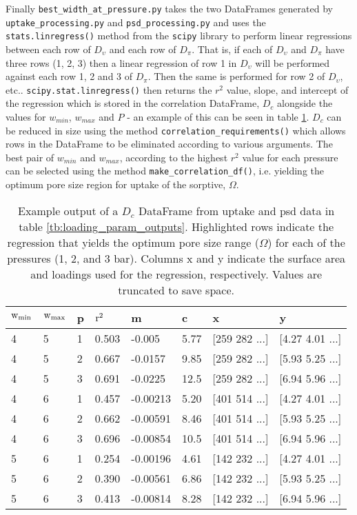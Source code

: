 Finally \verb|best_width_at_pressure.py| takes the two DataFrames generated by \verb|uptake_processing.py| and \verb|psd_processing.py| and uses the \verb|stats.linregress()| method from the \verb|scipy| library\citep{SciPy2020} to perform linear regressions between each row of $D_\upsilon$ and each row of $D_\pi$. That is, if each of $D_\upsilon$ and $D_\pi$ have three rows (1, 2, 3) then a linear regression of row 1 in $D_\upsilon$ will be performed against each row 1, 2 and 3 of $D_\pi$. Then the same is performed for row 2 of $D_\upsilon$, etc.. \verb|scipy.stat.linregress()| then returns the $r^2$ value, slope, and intercept of the regression which is stored in the correlation DataFrame, $D_c$ alongside the values for $w_{min}$, $w_{max}$ and $P$ - an example of this can be seen in table \ref{tb:D_c}. $D_c$ can be reduced in size using the method \verb|correlation_requirements()| which allows rows in the DataFrame to be eliminated according to various arguments. The best pair of $w_{min}$ and $w_{max}$, according to the highest $r^2$ value for each pressure can be selected using the method \verb|make_correlation_df()|, i.e. yielding the optimum pore size region for uptake of the sorptive, $\Omega$.

\begin{table}[h!]
    \centering
    \begin{tabular}{l|l|l|l|l|l|l|l}
        $\rm w_{min}$ & $\rm w_{max}$ & p & $\rm r^2$ & m & c & x & y \\
        \midrule
        \rowcolor{yellow} 4 & 5 & 1 & 0.503 & -0.005 & 5.77 & [259 282 ...] & [4.27 4.01 ...] \\
        \rowcolor{yellow} 4 & 5 & 2 & 0.667 & -0.0157	& 9.85 & [259 282 ...] & [5.93 5.25 ...] \\
        4 & 5 & 3 & 0.691 & -0.0225 & 12.5 & [259 282 ...] & [6.94 5.96 ...] \\
        4 & 6 & 1 & 0.457 & -0.00213 & 5.20 & [401 514 ...] & [4.27 4.01 ...] \\
        4 &	6 & 2 & 0.662 & -0.00591 & 8.46	& [401 514 ...] & [5.93 5.25 ...] \\
        \rowcolor{yellow} 4 &	6 & 3 &	0.696 & -0.00854 & 10.5 & [401 514 ...] & [6.94 5.96 ...] \\
        5 & 6 & 1 & 0.254 & -0.00196 & 4.61 & [142 232 ...] & [4.27 4.01 ...] \\
        5 & 6 & 2 & 0.390 & -0.00561 & 6.86 & [142 232 ...] & [5.93 5.25 ...] \\
        5 & 6 & 3 & 0.413 & -0.00814 & 8.28 & [142 232 ...] & [6.94 5.96 ...] \\
    \end{tabular}
    \caption{Example output of a $D_c$ DataFrame from  uptake and \acrshort{psd} data in table \ref{tb:loading_param_outputs}. Highlighted rows indicate the regression that yields the optimum pore size range ($\Omega$) for each of the pressures (1, 2, and 3 bar). Columns x and y indicate the surface area and loadings used for the regression, respectively. Values are truncated to save space.}
    \label{tb:D_c}
\end{table}


